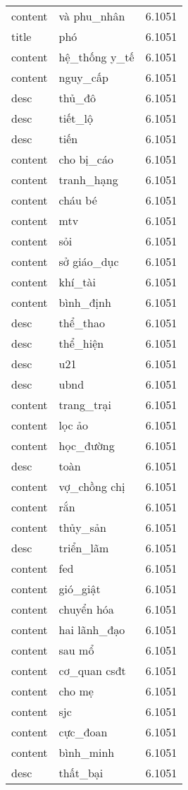 \documentclass{article}
\begin{document}
\begin{tabular}{lll}
content & và phu\_nhân & 6.1051\\
title & phó & 6.1051\\
content & hệ\_thống y\_tế & 6.1051\\
content & nguy\_cấp & 6.1051\\
desc & thủ\_đô & 6.1051\\
desc & tiết\_lộ & 6.1051\\
desc & tiến & 6.1051\\
content & cho bị\_cáo & 6.1051\\
content & tranh\_hạng & 6.1051\\
content & cháu bé & 6.1051\\
content & mtv & 6.1051\\
content & sỏi & 6.1051\\
content & sở giáo\_dục & 6.1051\\
content & khí\_tài & 6.1051\\
content & bình\_định & 6.1051\\
desc & thể\_thao & 6.1051\\
desc & thể\_hiện & 6.1051\\
desc & u21 & 6.1051\\
desc & ubnd & 6.1051\\
content & trang\_trại & 6.1051\\
content & lọc ảo & 6.1051\\
content & học\_đường & 6.1051\\
desc & toàn & 6.1051\\
content & vợ\_chồng chị & 6.1051\\
content & rắn & 6.1051\\
content & thủy\_sản & 6.1051\\
desc & triển\_lãm & 6.1051\\
content & fed & 6.1051\\
content & gió\_giật & 6.1051\\
content & chuyển hóa & 6.1051\\
content & hai lãnh\_đạo & 6.1051\\
content & sau mổ & 6.1051\\
content & cơ\_quan csđt & 6.1051\\
content & cho mẹ & 6.1051\\
content & sjc & 6.1051\\
content & cực\_đoan & 6.1051\\
content & bình\_minh & 6.1051\\
desc & thất\_bại & 6.1051\\

\end{tabular}
\end{document}
